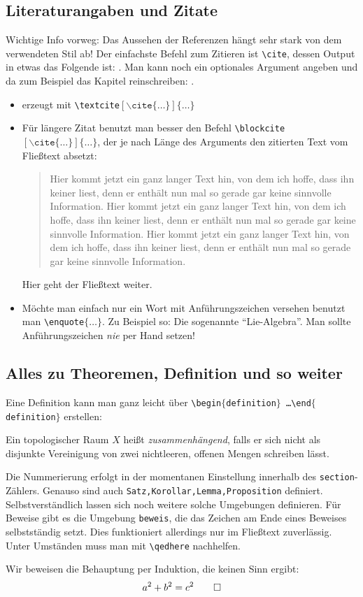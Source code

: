 \subsection{Literaturangaben und Zitate} %
Wichtige Info vorweg: Das Aussehen der Referenzen hängt sehr stark von dem verwendeten Stil ab! Der einfachste Befehl zum Zitieren ist 
\texttt{\textbackslash{}cite}, dessen Output in etwas das Folgende ist: \cite{CGL}. Man kann noch ein optionales Argument angeben und da zum Beispiel das Kapitel reinschreiben: \cite[Kapitel $\pi$]{CGL}.
\begin{itemize}
	\item {} erzeugt mit \texttt{\textbackslash{}textcite$[\backslash\texttt{cite}\{\ldots\}]\{\ldots\}$}
	\item Für längere Zitat benutzt man besser den Befehl \texttt{\textbackslash{}blockcite$[\backslash\texttt{cite}\{\ldots\}]\{\ldots\}$}, der je nach 
	Länge des Arguments den zitierten Text vom Fließtext absetzt: \blockquote[\cite{CGL}]{Hier kommt jetzt ein ganz langer Text hin, von dem ich hoffe, 
	dass ihn keiner liest, denn er enthält nun mal so gerade gar keine sinnvolle Information. Hier kommt jetzt ein ganz langer Text hin, von dem ich hoffe, 
	dass ihn keiner liest, denn er enthält nun mal so gerade gar keine sinnvolle Information. Hier kommt jetzt ein ganz langer Text hin, von dem ich hoffe, 
	dass ihn keiner liest, denn er enthält nun mal so gerade gar keine sinnvolle Information.}
	Hier geht der Fließtext weiter.
	\item Möchte man einfach nur ein Wort mit Anführungszeichen versehen benutzt man \texttt{\textbackslash{}enquote$\{\ldots \}$}. Zu Beispiel so:
	Die sogenannte \enquote{Lie-Algebra}. Man sollte Anführungszeichen \emph{nie} per Hand setzen!
\end{itemize}

\subsection{Alles zu Theoremen, Definition und so weiter} %
Eine Definition kann man ganz leicht über \texttt{\textbackslash{}begin$\{$definition$\}$ \ldots \textbackslash{}end$\{$definition$\}$} erstellen:
\begin{definition}
Ein topologischer Raum $X$ heißt \emph{zusammenhängend}, falls er sich nicht als disjunkte Vereinigung von zwei nichtleeren, offenen Mengen schreiben lässt.
\end{definition}
Die Nummerierung erfolgt in der momentanen Einstellung innerhalb des \texttt{section}-Zählers. Genauso sind auch \texttt{Satz,Korollar,Lemma,Proposition} definiert. 
Selbstverständlich lassen sich noch weitere solche Umgebungen definieren. Für Beweise gibt es die Umgebung \texttt{beweis}, die das Zeichen am Ende eines Beweises selbstständig setzt. Dies funktioniert allerdings nur im Fließtext zuverlässig. Unter Umständen muss man mit \texttt{\textbackslash{}qedhere} nachhelfen.
\begin{beweis}
Wir beweisen die Behauptung per Induktion, die keinen Sinn ergibt:
\[
	a^2+b^2=c^2 \qedhere
\]
\end{beweis}

